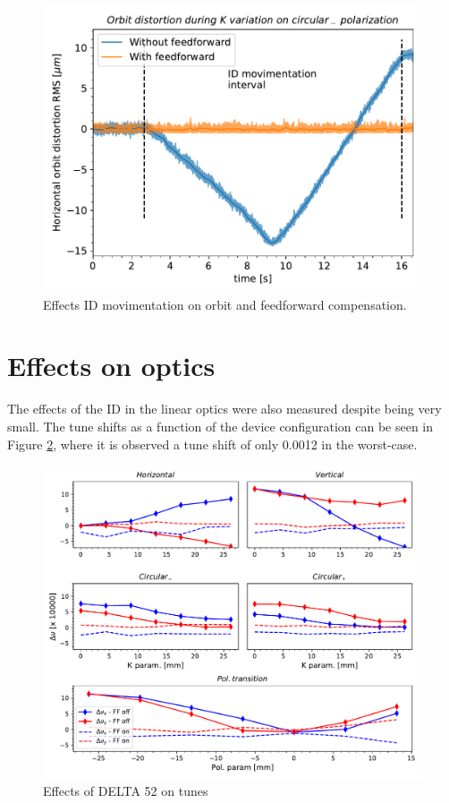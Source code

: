 \documentclass[a4paper,
               keeplastbox,   %
               ]{jacow}
\begin{document}
\begin{figure}[!h]
    \centering
   \includegraphics[width=0.75\columnwidth]{THPS18_f4.pdf}
   \caption{Effects ID movimentation on orbit and feedforward compensation.}
   \label{fig:orbit_fast}
\end{figure}

\section{Effects on optics}

The effects of the ID in the linear optics were also measured despite being very small. The tune shifts as a function of the device configuration can be seen in Figure \ref{fig:tunes}, where it is observed a tune shift of only 0.0012 in the worst-case.

\begin{figure}[!h]
    \centering
   \includegraphics[width=\columnwidth]{Tune_deviation.pdf}
   \caption{Effects of DELTA 52 on tunes}
   \label{fig:tunes}
\end{figure}
\end{document}
